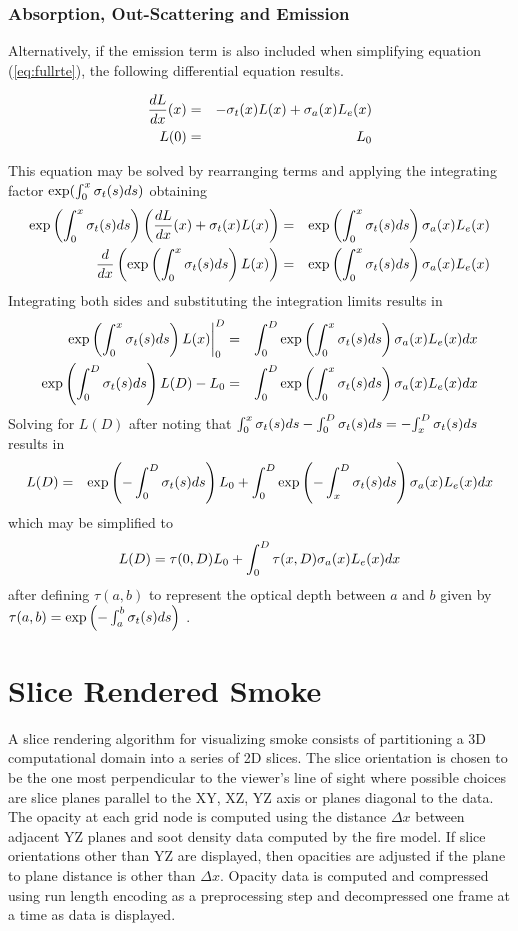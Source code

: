 %
%

\subsubsection{Absorption, Out-Scattering and Emission}
Alternatively, if the emission term is also included when simplifying equation (\ref{eq:fullrte}),  the following differential equation results.

\begin{eqnarray}
\label{eq:simple_rte}
\frac{dL}{dx}(x)&=&-\sigma_t(x) L(x) + \sigma_a(x) L_e(x)\\
 L(0)&=&L_0\nonumber
\end{eqnarray}

This equation may be solved by rearranging terms and applying the integrating factor $\exp(\int_0^x \sigma_t(s) ds)$ obtaining
\begin{eqnarray*}
\exp\left({\int_0^x \sigma_t(s) ds}\right)\left(\frac{dL}{dx}(x)+\sigma_t(x) L(x)\right)&=&  \exp\left({\int_0^x \sigma_t(s) ds}\right)\sigma_a(x) L_e(x)\\
\frac{d}{dx}\left(\exp\left({\int_0^x \sigma_t(s) ds}\right) L(x)\right)&=& \exp\left({\int_0^x \sigma_t(s) ds}\right)\sigma_a(x) L_e(x)
\end{eqnarray*}
Integrating both sides and substituting the integration limits results in
\begin{eqnarray*}
\left.\exp\left({\int_0^x \sigma_t(s) ds}\right) L(x)\right|_0^D&=& \int_0^D\exp\left({\int_0^x \sigma_t(s) ds}\right)\sigma_a(x) L_e(x) dx \\
\exp\left({\int_0^D \sigma_t(s) ds}\right) L(D)-L_0&=& \int_0^D\exp\left({\int_0^x \sigma_t(s) ds}\right)\sigma_a(x) L_e(x) dx
\end{eqnarray*}
Solving for $L(D)$ after noting that
${\int_0^x \sigma_t(s) ds}-{\int_0^D \sigma_t(s) ds}=-{\int_x^D \sigma_t(s) ds}$ results in
\begin{eqnarray*}
L(D)&=&\exp\left({-\int_0^D \sigma_t(s) ds}\right) L_0+ \int_0^D\exp\left({-\int_x^D \sigma_t(s) ds}\right)\sigma_a(x) L_e(x) dx\\
\end{eqnarray*}
which may be simplified to
\begin{equation}
 L(D)=\tau(0,D)L_0 + \int_0^D\tau(x,D)\sigma_a(x)L_e(x) dx
\end{equation}
after defining $\tau(a,b)$ to represent the optical depth between $a$ and $b$ given
by $\tau(a,b)=\exp\left({-\int_a^b \sigma_t(s) ds}\right)$ .


%
%

\section{Slice Rendered Smoke}
A slice rendering algorithm for visualizing smoke consists of partitioning a 3D computational domain into a series of 2D slices.  The slice orientation is chosen to be the one most perpendicular to the viewer's line of sight where possible choices are slice planes parallel to the XY, XZ, YZ axis or planes diagonal to the data.  The opacity at each grid node is computed using the distance $\Delta x$ between adjacent YZ planes and soot density data computed by the fire model.  If slice orientations other than YZ are displayed, then opacities are adjusted if the plane to plane distance is other than $\Delta x$.  Opacity data is computed and compressed using run length encoding as a preprocessing step and decompressed one frame at a time as data is displayed.


